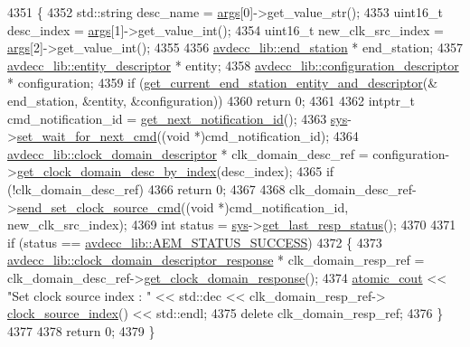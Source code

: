 \begin{DoxyCode}
4351 \{
4352     std::string desc\_name = \hyperlink{namespaceastime__fitline_a8187411843a6284ffb964ef3fb9fcab3}{args}[0]->get\_value\_str();
4353     uint16\_t desc\_index = \hyperlink{namespaceastime__fitline_a8187411843a6284ffb964ef3fb9fcab3}{args}[1]->get\_value\_int();
4354     uint16\_t new\_clk\_src\_index = \hyperlink{namespaceastime__fitline_a8187411843a6284ffb964ef3fb9fcab3}{args}[2]->get\_value\_int();
4355 
4356     \hyperlink{classavdecc__lib_1_1end__station}{avdecc\_lib::end\_station} * end\_station;
4357     \hyperlink{classavdecc__lib_1_1entity__descriptor}{avdecc\_lib::entity\_descriptor} * entity;
4358     \hyperlink{classavdecc__lib_1_1configuration__descriptor}{avdecc\_lib::configuration\_descriptor} * configuration;
4359     \textcolor{keywordflow}{if} (\hyperlink{classcmd__line_ac2d4611fba7db03d436a2e3c1e64828e}{get\_current\_end\_station\_entity\_and\_descriptor}(&
      end\_station, &entity, &configuration))
4360         \textcolor{keywordflow}{return} 0;
4361 
4362     intptr\_t cmd\_notification\_id = \hyperlink{classcmd__line_a57486218387d1aa9d262eb7c176154ad}{get\_next\_notification\_id}();
4363     \hyperlink{classcmd__line_a485db4800e331cb4052c447fdf5d154e}{sys}->\hyperlink{classavdecc__lib_1_1system_a26b769584f10225077da47583edda33e}{set\_wait\_for\_next\_cmd}((\textcolor{keywordtype}{void} *)cmd\_notification\_id);
4364     \hyperlink{classavdecc__lib_1_1clock__domain__descriptor}{avdecc\_lib::clock\_domain\_descriptor} * clk\_domain\_desc\_ref = 
      configuration->\hyperlink{classavdecc__lib_1_1configuration__descriptor_ab5603e0fa2cc0695b240fe856b62776d}{get\_clock\_domain\_desc\_by\_index}(desc\_index);
4365     \textcolor{keywordflow}{if} (!clk\_domain\_desc\_ref)
4366         \textcolor{keywordflow}{return} 0;
4367 
4368     clk\_domain\_desc\_ref->\hyperlink{classavdecc__lib_1_1clock__domain__descriptor_a5633eebe5d5484103b22b1a075c49f66}{send\_set\_clock\_source\_cmd}((\textcolor{keywordtype}{void} *)cmd\_notification\_id, 
      new\_clk\_src\_index);
4369     \textcolor{keywordtype}{int} status = \hyperlink{classcmd__line_a485db4800e331cb4052c447fdf5d154e}{sys}->\hyperlink{classavdecc__lib_1_1system_aa63e8d1a4e51f695cdcccc9340922407}{get\_last\_resp\_status}();
4370 
4371     \textcolor{keywordflow}{if} (status == \hyperlink{namespaceavdecc__lib_affd436edb2cecd20cfd784a84f852b2bac947077909cb590b84f4b5db413080e0}{avdecc\_lib::AEM\_STATUS\_SUCCESS})
4372     \{
4373         \hyperlink{classavdecc__lib_1_1clock__domain__descriptor__response}{avdecc\_lib::clock\_domain\_descriptor\_response} * 
      clk\_domain\_resp\_ref = clk\_domain\_desc\_ref->\hyperlink{classavdecc__lib_1_1clock__domain__descriptor_a2c3eca99d20f1396befa4e71e438593c}{get\_clock\_domain\_response}();
4374         \hyperlink{cmd__line_8h_a0bc38ccc65c79ba06c6fcd7b4bf554c3}{atomic\_cout} << \textcolor{stringliteral}{"Set clock source index : "} << std::dec << clk\_domain\_resp\_ref->
      \hyperlink{classavdecc__lib_1_1clock__domain__descriptor__response_ad8ab5475f732fd4a64d51d9a2010ade5}{clock\_source\_index}() << std::endl;
4375         \textcolor{keyword}{delete} clk\_domain\_resp\_ref;
4376     \}
4377 
4378     \textcolor{keywordflow}{return} 0;
4379 \}
\end{DoxyCode}


